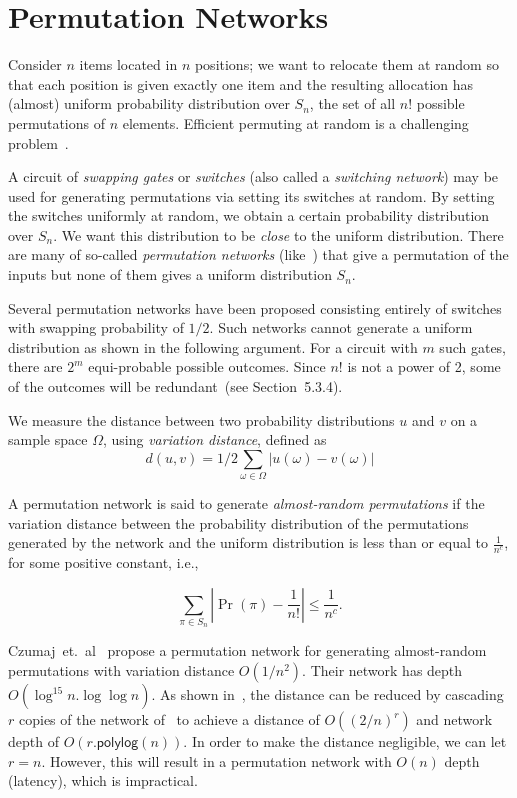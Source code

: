 \documentclass[11pt]{article}
\theoremstyle{plain}
\begin{document}
\section{Permutation Networks}

Consider $n$ items located in $n$ positions; we want to relocate
them at random so that each position is given exactly one item and
the resulting allocation has (almost) uniform probability distribution
over $S_{n}$, the set of all $n!$ possible permutations of $n$
elements. Efficient permuting at random is a challenging problem~\cite{Czumaj01switchingnetworks}.

A circuit of \emph{swapping gates} or \emph{switches} (also called
a \emph{switching network}) may be used for generating permutations
via setting its switches at random. By setting the switches uniformly
at random, we obtain a certain probability distribution over $S_{n}$.
We want this distribution to be \emph{close} to the uniform distribution.
There are many of so-called \emph{permutation networks} (like~\cite{Waksman:1968:PN:321439.321449})
that give a permutation of the inputs but none of them gives a uniform
distribution $S_{n}$.

Several permutation networks have been proposed consisting entirely
of switches with swapping probability of $1/2$. Such networks cannot
generate a uniform distribution as shown in the following argument.
For a circuit with $m$ such gates, there are $2^{m}$ equi-probable
possible outcomes. Since $n!$ is not a power of 2, some of the outcomes
will be redundant~(see \cite{Knuth:1998:ACP:280635} Section~5.3.4).

We measure the distance between two probability distributions $u$
and $v$ on a sample space $\Omega$, using \emph{variation distance},
defined as 
\[
d(u,v)=1/2\sum_{\omega\in\Omega}|u(\omega)-v(\omega)|
\]

A permutation network is said to generate \emph{almost-random permutations}
if the variation distance between the probability distribution of
the permutations generated by the network and the uniform distribution
is less than or equal to $\frac{1}{n^{c}}$, for some positive constant,
i.e., 

\[
\sum_{\pi\in S_{n}}|\Pr(\pi)-\frac{1}{n!}|\leq\frac{1}{n^{c}}.
\]

Czumaj~et.~al~\cite{Czumaj01switchingnetworks} propose a permutation
network for generating almost-random permutations with variation distance
$O(1/n^{2})$. Their network has depth $O(\log^{15}{n}.\log{\log{n}})$.
As shown in~\cite{Boyle:2013:CLS:2450206.2450227}, the distance
can be reduced by cascading $r$ copies of the network of~\cite{Czumaj01switchingnetworks}
to achieve a distance of $O((2/n)^{r})$ and network depth of $O(r.\mathsf{polylog}(n))$.
In order to make the distance negligible, we can let $r=n$. However,
this will result in a permutation network with $O(n)$ depth (latency),
which is impractical.
\end{document}
